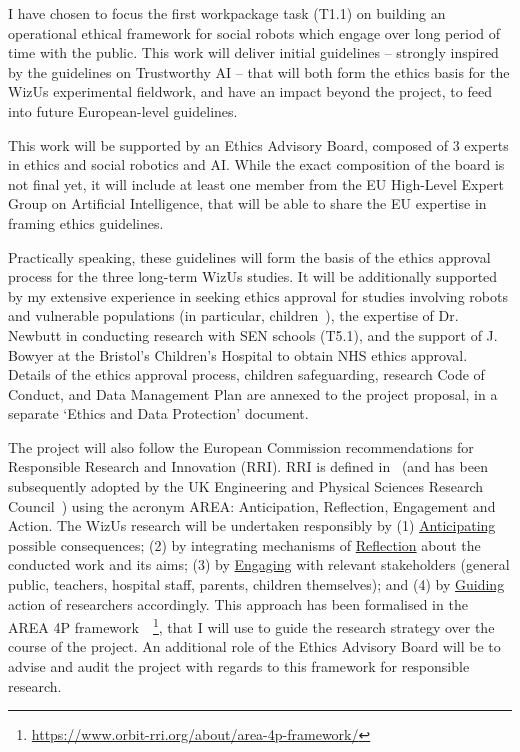 \documentclass[11pt,a4paper]{report}
\newcommand{\project}{WizUs\xspace}
\begin{document}
I have chosen to focus the first workpackage task (T1.1) on building an
operational ethical framework for social robots which engage over long period of
time with the public. This work will deliver initial guidelines -- strongly
inspired by the guidelines on Trustworthy AI -- that will both form the ethics
basis for the \project experimental fieldwork, and have an impact beyond the
project, to feed into future European-level guidelines.

This work will be supported by an Ethics Advisory Board, composed of 3 experts
in ethics and social robotics and AI. While the exact composition of the board
is not final yet, it will include at least one member from the EU High-Level
Expert Group on Artificial Intelligence, that will be able to share the EU
expertise in framing ethics guidelines.

Practically speaking, these guidelines will form the basis of the ethics
approval process for the three long-term \project studies. It will be
additionally supported by my extensive experience in seeking ethics approval for
studies involving robots and vulnerable populations (in particular,
children~\cite{lemaignan2016learning,lemaignan2018pinsoro,senft2019teaching}),
the expertise of Dr. Newbutt in conducting research with SEN schools (T5.1), and
the support of J. Bowyer at the Bristol's Children's Hospital to obtain NHS ethics
approval. Details of the ethics approval process, children safeguarding,
research Code of Conduct, and Data Management Plan are annexed to the project
proposal, in a separate `Ethics and Data Protection' document.


The project will also follow the European Commission recommendations for
Responsible Research and Innovation (RRI). RRI is defined
in~\cite{stilgoe2013developing} (and has been subsequently adopted by the UK Engineering
and Physical Sciences Research Council~\cite{owen2014uk}) using the acronym
AREA: Anticipation, Reflection, Engagement and Action. The \project research
will be undertaken responsibly by (1) \ul{Anticipating} possible consequences;
(2) by integrating mechanisms of \ul{Reflection} about the conducted work and its
aims; (3) by \ul{Engaging} with relevant stakeholders (general public, teachers,
hospital staff, parents, children themselves); and (4) by \ul{Guiding} action of
researchers accordingly. This approach has been formalised in the AREA 4P
framework~\cite{stahl2018implementing}~\footnote{\url{https://www.orbit-rri.org/about/area-4p-framework/}},
that I will use to guide the research strategy over the course of the project.
An additional role of the Ethics Advisory Board will be to advise and audit the
project with regards to this framework for responsible research.
\end{document}

